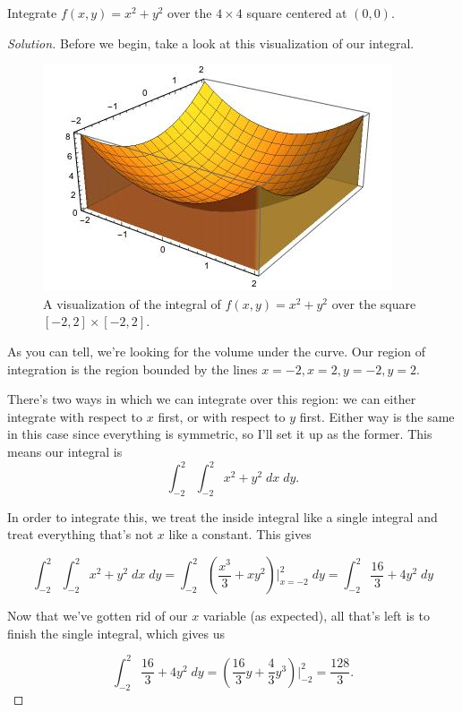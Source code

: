 \documentclass[11 pt]{scrartcl}
\begin{document}
\begin{example}
    Integrate $f(x,y) = x^2 + y^2$ over the $4\times 4$ square centered at $(0,0)$. 
\end{example}
\begin{proof}[Solution]
Before we begin, take a look at this visualization of our integral. 

\begin{figure}[!htb]
    \centering
    \includegraphics[scale=0.5]{x2y2.jpeg}
    \caption{A visualization of the integral of $f(x,y) = x^2 + y^2$ over the square $[-2,2]\times [-2,2]$.}
\end{figure}

As you can tell, we're looking for the volume under the curve. Our region of integration is the region bounded by the lines $x = -2, x = 2, y = -2, y = 2$. 

There's two ways in which we can integrate over this region: we can either integrate with respect to $x$ first, or with respect to $y$ first. Either way is the same in this case since everything is symmetric, so I'll set it up as the former. 
    This means our integral is 
\[ \int_{-2}^2 \int_{-2}^2 x^2+y^2 \; dx \; dy.\]

In order to integrate this, we treat the inside integral like a single integral and treat everything that's not $x$ like a constant. This gives 

\[ \int_{-2}^2 \int_{-2}^2 x^2+y^2 \; dx \; dy = \int_{-2}^2 \left(\frac{x^3}{3}+xy^2\right)\Big\rvert^2_{x=-2} \; dy = \int_{-2}^2 \frac{16}{3} + 4y^2 \; dy\]

Now that we've gotten rid of our $x$ variable (as expected), all that's left is to finish the single integral, which gives us 

\[ \int_{-2}^2 \frac{16}{3} + 4y^2 \; dy = \left(\frac{16}{3}y + \frac{4}{3} y^3\right)\Big\rvert^{2}_{-2} = \frac{128}{3}.\]
\end{proof}
\end{document}
